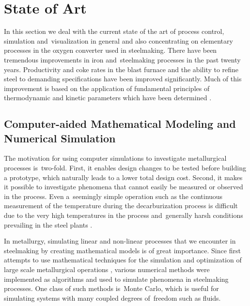\section{State of Art}

In this section we deal with the current state of the art of process control, simulation and~visualization in general and also concentrating on elementary processes in the oxygen converter used in steelmaking. There have been tremendous improvements in iron and~steelmaking processes in the past twenty years. Productivity and coke rates in the blast furnace and the ability to refine steel to demanding specifications have been improved significantly. Much of this improvement is based on the application of fundamental principles of thermodynamic and kinetic parameters which have been determined \citep{Turkdogan1999}.

\subsection{Computer-aided Mathematical Modeling and Numerical Simulation}

The motivation for using computer simulations to investigate metallurgical processes is~two-fold. First, it enables design changes to be tested before building a prototype, which naturally leads to a lower total design cost. Second, it makes it possible to investigate phenomena that cannot easily be measured or observed in the process. Even a~seemingly simple operation such as the continuous measurement of the temperature during the decarburization process is difficult due to the very high temperatures in the process and~generally harsh conditions prevailing in the steel plants \citep{Ersson2018}.

In metallurgy, simulating linear and non-linear processes that we encounter in steelmaking by creating mathematical models is of great importance. Since first attempts to use mathematical techniques for the simulation and optimization of large scale metallurgical operations \citep{Ray1973}, various numerical methods were implemented as algorithms and used to simulate phenomena in steelmaking processes. One class of such methods is~Monte Carlo, which is useful for simulating systems with many coupled degrees of~freedom such as fluids.

